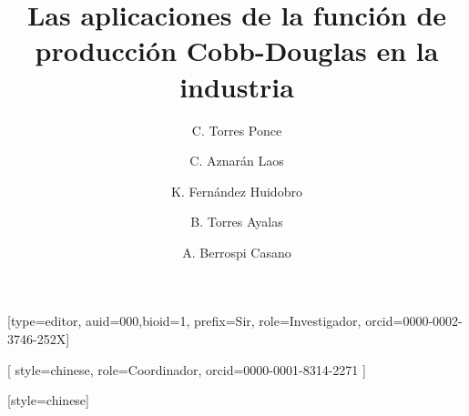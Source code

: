 \documentclass[a4paper,fleqn]{cas-dc}
\begin{document}
\let\WriteBookmarks\relax
\def\floatpagepagefraction{1}
\def\textpagefraction{.001}

\title [mode = title]{Las aplicaciones de la función de producción Cobb-Douglas en la industria}
\tnotemark[1]%





\author[1,2]{C. Torres Ponce}[type=editor,
                        auid=000,bioid=1,
                        prefix=Sir,
                        role=Investigador,
                        orcid=0000-0002-3746-252X]
\cormark[1]


\address[1]{Facultad de Ciencias - Escuela Profesional de Matemática}

\author[1,2]{C. Aznarán Laos}[%
style=chinese,
role=Coordinador,
orcid=0000-0001-8314-2271
]
\cormark[2]

\author[2,3]{K. Fernández Huidobro}
\cormark[1]


\address[2]{Facultad de Ciencias - Escuela Profesional de Ciencia de la Computación}

\author[2,3]{B. Torres Ayalas}
\cormark[1]
\author[2,3]
{A. Berrospi Casano}[style=chinese]
\cormark[2]

\address[3]{Universidad Nacional de Ingeniería, Av. Túpac Amaru 210, Rímac, Lima 25, Perú}

\end{document}
